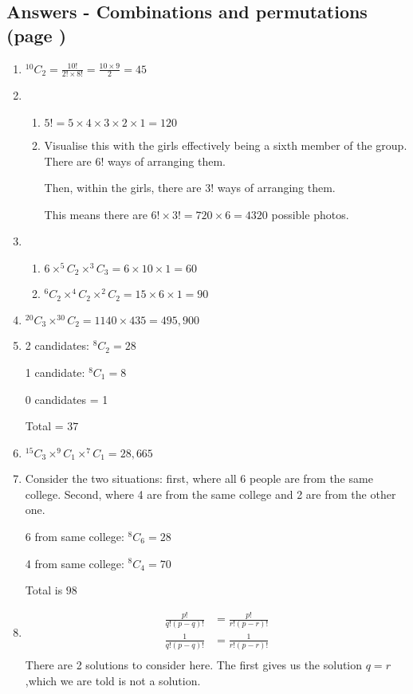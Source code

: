 \documentclass[../main.tex]{subfiles}
\begin{document}
\subsection*{Answers - Combinations and permutations (page \pageref{Combinations and permuations})}

\begin{enumerate}
    \item
    \(^{10}C_2=\frac{10!}{2!\times 8!}=\frac{10\times 9}{2}=45\)
    \item 
        \begin{enumerate}
            \item 
            \(5!=5\times 4\times 3\times 2\times 1=120\)
            \item 
            Visualise this with the girls effectively being a sixth member of the group. There are \(6!\) ways of arranging them.

            Then, within the girls, there are \(3!\) ways of arranging them.

            This means there are \(6! \times 3!=720\times 6=4320\) possible photos.
        \end{enumerate}
    \item 
        \begin{enumerate}
            \item 
            \(6\times ^5C_2 \times ^3C_3 =6\times 10\times 1=60\)
            \item 
            \(^6C_2 \times ^4C_2 \times ^2C_2 = 15\times 6\times 1=90\)
        \end{enumerate}
    \item 
    \( ^{20}C_3\times ^{30}C_2 = 1140\times 435=495,900 \)
    \item 
    2 candidates: \(^8C_2 = 28\)

    1 candidate: \(^8C_1 = 8\)

    0 candidates  = 1

    Total = \(37\)
    \item 
    \(^{15}C_3 \times ^9C_1 \times ^7C_1 = 28,665\)
    \item 
    Consider the two situations: first, where all 6 people are from the same college. Second, where 4 are from the same college and 2 are from the other one.

    6 from same college: \(^8C_6=28\)

    4 from same college: \(^8C_4=70\)

    Total is \(98\)
    \item 
    \begin{align*}
        \frac{p!}{q!(p-q)!}
        &=\frac{p!}{r!(p-r)!}\\
        \frac{1}{q!(p-q)!}
        &=\frac{1}{r!(p-r)!}\\
    \end{align*}
    There are 2 solutions to consider here. The first gives us the solution \(q=r \),which we are told is not a solution.


\end{enumerate}
\end{document}
